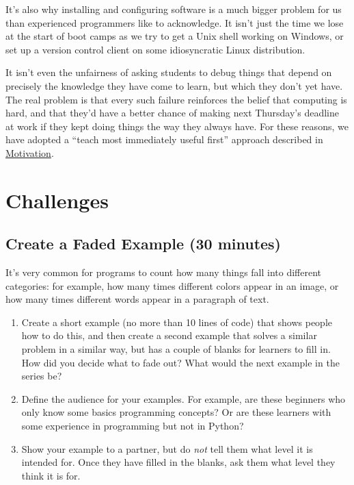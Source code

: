 \documentclass[10pt,statementpaper]{memoir}
\begin{document}
It's also why installing and configuring software is a much bigger
problem for us than experienced programmers like to acknowledge. It
isn't just the time we lose at the start of boot camps as we try to get
a Unix shell working on Windows, or set up a version control client on
some idiosyncratic Linux distribution.

It isn't even the unfairness of asking students to debug things that
depend on precisely the knowledge they have come to learn, but which
they don't yet have. The real problem is that every such failure
reinforces the belief that computing is hard, and that they'd have a
better chance of making next Thursday's deadline at work if they kept
doing things the way they always have. For these reasons, we have
adopted a ``teach most immediately useful first'' approach described in
\href{motivation.html}{Motivation}.

\section{Challenges}\label{challenges-4}

\subsection*{Create a Faded Example (30
minutes)}\label{create-a-faded-example-30-minutes}

It's very common for programs to count how many things fall into
different categories: for example, how many times different colors
appear in an image, or how many times different words appear in a
paragraph of text.

\begin{enumerate}
\def\labelenumi{\arabic{enumi}.}
\item
  Create a short example (no more than 10 lines of code) that shows
  people how to do this, and then create a second example that solves a
  similar problem in a similar way, but has a couple of blanks for
  learners to fill in. How did you decide what to fade out? What would
  the next example in the series be?
\item
  Define the audience for your examples. For example, are these
  beginners who only know some basics programming concepts? Or are these
  learners with some experience in programming but not in Python?
\item
  Show your example to a partner, but do \emph{not} tell them what level
  it is intended for. Once they have filled in the blanks, ask them what
  level they think it is for.
\end{enumerate}
\end{document}
